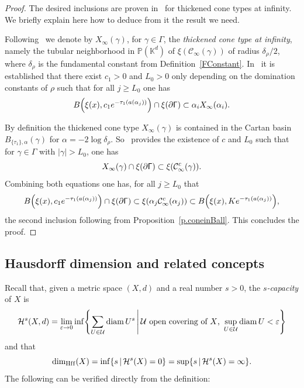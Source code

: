 \documentclass[AHL,Unicode,longabstracts,MathTools]{cedram}
\DeclareMathOperator{\diam}{diam}
\DeclareMathOperator{\Hff}{dim_{Hf{}f}}
\newcommand{\cartan}{a}
\renewcommand{\sf}[1]{{\mathsf{#1}}}
\newcommand{\G}{\sf{\Gamma}}
\newcommand{\cal}{\mathcal}
\newcommand{\cone}{\cal{C}}
\renewcommand{\P}{\mathbb{P}}
\newcommand{\K}{\mathbb{K}}
\newcommand{\g}{\gamma}
\newcommand{\bord}{\partial}
\newcommand{\slroot}{{\tau}}
\renewcommand{\epsilon}{\varepsilon}
\renewcommand{\/}{\backslash}
\newcommand{\<}{\langle}
\renewcommand{\>}{\rangle}
\renewcommand*{\to}{\mathchoice{\longrightarrow}{\rightarrow}{\rightarrow}{\rightarrow}}
\let\originalleft\left
\let\originalright\right
\renewcommand{\left}{\mathopen{}\mathclose\bgroup\originalleft}
\renewcommand{\right}{\aftergroup\egroup\originalright}
\begin{document}
\begin{proof}
The desired inclusions are proven in~\cite{PSW1} for thickened cone types at infinity. We briefly explain here how to deduce from it the result we need.

Following~\cite{PSW1} we denote by $X_\infty(\g)$, for $\g\in\G$, the \emph{thickened cone type at infinity}, namely the tubular neighborhood in $\P(\K^d)$ of $\xi(\cone_\infty(\g))$ of radius $\delta_\rho/2$, where $\delta_\rho$ is the fundamental constant from Definition~\ref{FConstant}. In~\cite[Corollary~5.10]{PSW1} it is established that there exist $c_1>0$ and $L_0>0$ only depending on the domination constants of $\rho$ such that for all $j\geq L_0$ one has
\[
B\left(\xi(x),c_1e^{-\slroot_1(\cartan(\alpha_j))}\right)\cap\xi(\bord\G)\subset \alpha_iX_\infty(\alpha_i).
\]

By definition the thickened cone type $X_\infty(\g)$ is contained in the Cartan basin $B_{\{\slroot_1\},\alpha}(\g)$ for $\alpha=-2\log\delta_\rho$. So~\cite[Proposition~3.3]{PSW2} provides the existence of $c$ and $L_0$ such that for $\g\in\G$ with $|\g|>L_0$, one has
\[
X_\infty(\g)\cap\xi(\bord\G)\subset\xi\left(\cone_\infty^{c}(\g)\right).
\]
Combining both equations one has, for all $j\geq L_0$ that
\begin{equation}\label{bola}
B\left(\xi(x),c_1e^{-\slroot_1(\cartan(\alpha_j))}\right)\cap\xi(\bord\G)\subset\xi\left(\alpha_j\cone_\infty^{c}(\alpha_j)\right) \subset B\left(\xi(x), Ke^{-\slroot_1(\cartan(\alpha_j))}\right),
\end{equation}
the second inclusion following from Proposition~\ref{p.coneinBall}. This concludes the proof.
\end{proof}



\subsection{Hausdorff dimension and related concepts} Recall that, given a metric space $(X,d)$ and a real number $s>0$, the \emph{$s$-capacity} of $X$ is
\[
\cal H^s(X,d)=\lim_{\epsilon\to 0}\inf\left\{\sum_{U\in\cal U} \diam U^s\,\middle|\, \cal U \text{ open covering of $X$, } \sup_{U\in\cal U}\diam U<\epsilon\right\}
\]
and that
\begin{equation}\label{HffDef}
\Hff(X)=\inf \left\{s\,\middle|\, \cal H^s(X)=0\right\}=\sup \left\{s\,\middle|\,\cal H^s(X)=\infty\right\}.
\end{equation}
The following can be verified directly from the definition:
\end{document}
